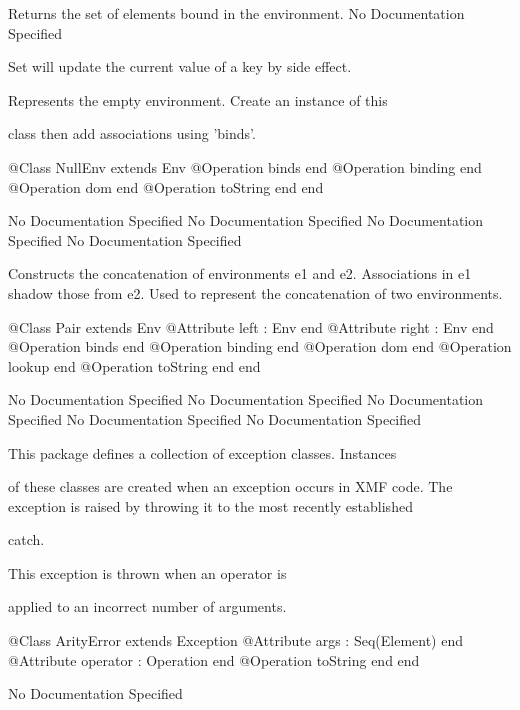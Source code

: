         Returns the set of elements bound in the environment.
No Documentation Specified

        Set will update the current value of a key by side effect.

      Represents the empty environment. Create an instance of this

      class then add associations using 'binds'.
\begin{Interface}
@Class NullEnv extends Env
  @Operation binds end
  @Operation binding end
  @Operation dom end
  @Operation toString end
end
\end{Interface}
No Documentation Specified
No Documentation Specified
No Documentation Specified
No Documentation Specified

      Constructs the concatenation of environments e1 and e2.
      Associations in e1 shadow those from e2.
      Used to represent the concatenation of two environments.
\begin{Interface}
@Class Pair extends Env
  @Attribute left : Env end
  @Attribute right : Env end
  @Operation binds end
  @Operation binding end
  @Operation dom end
  @Operation lookup end
  @Operation toString end
end
\end{Interface}
No Documentation Specified
No Documentation Specified
No Documentation Specified
No Documentation Specified
No Documentation Specified

      This package defines a collection of exception classes. Instances

      of these classes are created when an exception occurs in XMF code.
      The exception is raised by throwing it to the most recently established

      catch.

      This exception is thrown when an operator is

      applied to an incorrect number of arguments.
\begin{Interface}
@Class ArityError extends Exception
  @Attribute args : Seq(Element) end
  @Attribute operator : Operation end
  @Operation toString end
end
\end{Interface}
No Documentation Specified

